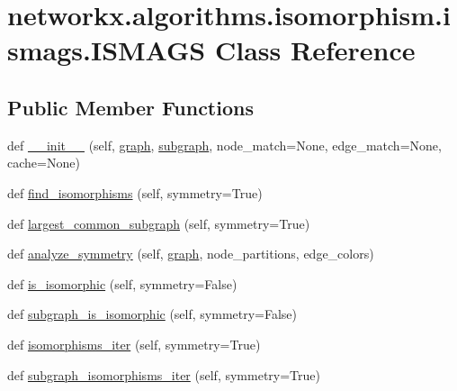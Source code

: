 \hypertarget{classnetworkx_1_1algorithms_1_1isomorphism_1_1ismags_1_1ISMAGS}{}\section{networkx.\+algorithms.\+isomorphism.\+ismags.\+I\+S\+M\+A\+GS Class Reference}
\label{classnetworkx_1_1algorithms_1_1isomorphism_1_1ismags_1_1ISMAGS}
\subsection*{Public Member Functions}
\begin{DoxyCompactItemize}
\item 
def \hyperlink{classnetworkx_1_1algorithms_1_1isomorphism_1_1ismags_1_1ISMAGS_a15c73c9b3bbbac8a6a2bf8c6d53e9528}{\+\_\+\+\_\+init\+\_\+\+\_\+} (self, \hyperlink{classnetworkx_1_1algorithms_1_1isomorphism_1_1ismags_1_1ISMAGS_aecadf72dedcab3af3a1f87d4b2b0c398}{graph}, \hyperlink{classnetworkx_1_1algorithms_1_1isomorphism_1_1ismags_1_1ISMAGS_a72e8b9194381ecd1760f122c47741002}{subgraph}, node\+\_\+match=None, edge\+\_\+match=None, cache=None)
\item 
def \hyperlink{classnetworkx_1_1algorithms_1_1isomorphism_1_1ismags_1_1ISMAGS_aee68cab930d165d0230de8ec1aa9b067}{find\+\_\+isomorphisms} (self, symmetry=True)
\item 
def \hyperlink{classnetworkx_1_1algorithms_1_1isomorphism_1_1ismags_1_1ISMAGS_a8bfe525305af3eea7a03d2045c84ca8e}{largest\+\_\+common\+\_\+subgraph} (self, symmetry=True)
\item 
def \hyperlink{classnetworkx_1_1algorithms_1_1isomorphism_1_1ismags_1_1ISMAGS_a2047adf8ebd6af4319f2be87d7f0a2c7}{analyze\+\_\+symmetry} (self, \hyperlink{classnetworkx_1_1algorithms_1_1isomorphism_1_1ismags_1_1ISMAGS_aecadf72dedcab3af3a1f87d4b2b0c398}{graph}, node\+\_\+partitions, edge\+\_\+colors)
\item 
def \hyperlink{classnetworkx_1_1algorithms_1_1isomorphism_1_1ismags_1_1ISMAGS_a29848db92e352ca9ae78be71d38e8879}{is\+\_\+isomorphic} (self, symmetry=False)
\item 
def \hyperlink{classnetworkx_1_1algorithms_1_1isomorphism_1_1ismags_1_1ISMAGS_aee8714f0058eabcf86ce107e23a7a91b}{subgraph\+\_\+is\+\_\+isomorphic} (self, symmetry=False)
\item 
def \hyperlink{classnetworkx_1_1algorithms_1_1isomorphism_1_1ismags_1_1ISMAGS_ab5c2f624ad727727c51c3c2e53ba7637}{isomorphisms\+\_\+iter} (self, symmetry=True)
\item 
def \hyperlink{classnetworkx_1_1algorithms_1_1isomorphism_1_1ismags_1_1ISMAGS_a0b6a909ac39ef0a7ddc4a861b45f2701}{subgraph\+\_\+isomorphisms\+\_\+iter} (self, symmetry=True)
\end{DoxyCompactItemize}
